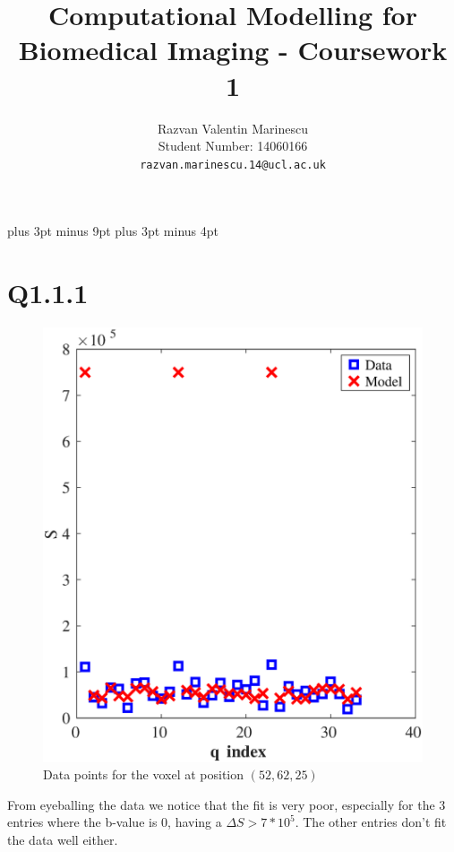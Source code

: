 \documentclass[11pt,a4paper,oneside]{report}
\title{Computational Modelling for Biomedical Imaging - Coursework 1}
\author{
Razvan Valentin Marinescu\\
Student Number: 14060166\\
\texttt{razvan.marinescu.14@ucl.ac.uk}
}
\begin{document}
\belowdisplayskip=12pt plus 3pt minus 9pt
\belowdisplayshortskip=7pt plus 3pt minus 4pt
\maketitle{}

\section*{Q1.1.1}
\begin{figure}
\includegraphics[scale=0.5]{figures/q111.eps}
\caption{Data points for the voxel at position $(52,62,25)$}
\end{figure}



From eyeballing the data we notice that the fit is very poor, especially for the 3 entries where the b-value is 0, having a $\Delta S > 7 * 10^5$. The other entries don't fit the data well either.
\end{document}
